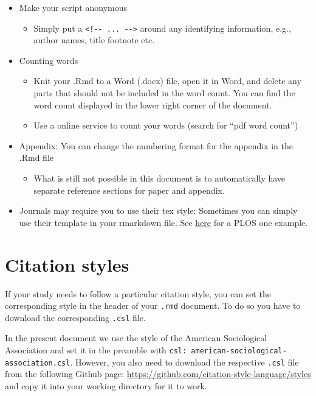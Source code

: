 \documentclass[
  12pt,
]{article}
\providecommand{\tightlist}{%
  \setlength{\itemsep}{0pt}\setlength{\parskip}{0pt}}
\begin{document}
\begin{itemize}
\tightlist
\item
  Make your script anonymous

  \begin{itemize}
  \tightlist
  \item
    Simply put a \texttt{\textless{}!-\/-\ ...\ -\/-\textgreater{}} around any identifying information, e.g., author names, title footnote etc.
  \end{itemize}
\item
  Counting words

  \begin{itemize}
  \tightlist
  \item
    Knit your .Rmd to a Word (.docx) file, open it in Word, and delete any parts that should not be included in the word count. You can find the word count displayed in the lower right corner of the document.
  \item
    Use a online service to count your words (search for ``pdf word count'')
  \end{itemize}
\item
  Appendix: You can change the numbering format for the appendix in the .Rmd file

  \begin{itemize}
  \tightlist
  \item
    What is still not possible in this document is to automatically have separate reference sections for paper and appendix.
  \end{itemize}
\item
  Journals may require you to use their tex style: Sometimes you can simply use their template in your rmarkdown file. See \href{https://dataverse.harvard.edu/dataset.xhtml?persistentId=doi:10.7910/DVN/LDUMNY}{here} for a PLOS one example.
\end{itemize}

\hypertarget{citation-styles}{%
\section{Citation styles}\label{citation-styles}}

If your study needs to follow a particular citation style, you can set the corresponding style in the header of your \texttt{.rmd} document. To do so you have to download the corresponding \texttt{.csl} file.

In the present document we use the style of the American Sociological Association and set it in the preamble with \texttt{csl:\ american-sociological-association.csl}. However, you also need to download the respective \texttt{.csl} file from the following Github page: \url{https://github.com/citation-style-language/styles} and copy it into your working directory for it to work.
\end{document}
